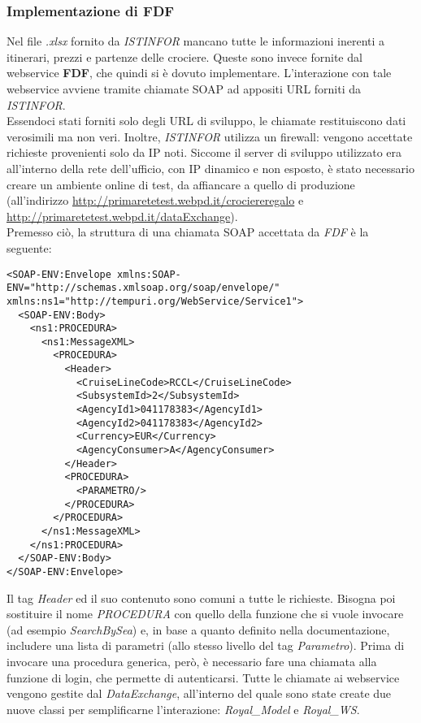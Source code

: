 \subsubsection{Implementazione di FDF}
Nel file \textit{.xlsx} fornito da \textit{ISTINFOR} mancano tutte le informazioni inerenti a itinerari, prezzi e partenze delle crociere. Queste sono invece fornite dal \gls{webservice} \textbf{FDF}, che quindi si è dovuto implementare. L'interazione con tale \gls{webservice} avviene tramite chiamate \gls{SOAP} ad appositi URL forniti da \textit{ISTINFOR}.\\ Essendoci stati forniti solo degli URL di sviluppo, le chiamate restituiscono dati verosimili ma non veri. Inoltre, \textit{ISTINFOR} utilizza un firewall: vengono accettate richieste provenienti solo da IP noti. Siccome il server di sviluppo utilizzato era all'interno della rete dell'ufficio, con IP dinamico e non esposto, è stato necessario creare un ambiente online di test, da affiancare a quello di produzione (all'indirizzo \url{http://primaretetest.webpd.it/crociereregalo} e \url{http://primaretetest.webpd.it/dataExchange}).\\
Premesso ciò, la struttura di una chiamata \gls{SOAP} accettata da \textit{FDF} è la seguente:
\begin{lstlisting}
<SOAP-ENV:Envelope xmlns:SOAP-ENV="http://schemas.xmlsoap.org/soap/envelope/" xmlns:ns1="http://tempuri.org/WebService/Service1">
  <SOAP-ENV:Body>
    <ns1:PROCEDURA>
      <ns1:MessageXML>
        <PROCEDURA>
          <Header>
            <CruiseLineCode>RCCL</CruiseLineCode>
            <SubsystemId>2</SubsystemId>
            <AgencyId1>041178383</AgencyId1>
            <AgencyId2>041178383</AgencyId2>
            <Currency>EUR</Currency>
            <AgencyConsumer>A</AgencyConsumer>
          </Header>
          <PROCEDURA>
            <PARAMETRO/>
          </PROCEDURA>
        </PROCEDURA>
      </ns1:MessageXML>
    </ns1:PROCEDURA>
  </SOAP-ENV:Body>
</SOAP-ENV:Envelope>
\end{lstlisting}Il tag \textit{Header} ed il suo contenuto sono comuni a tutte le richieste. Bisogna poi sostituire il nome \textit{PROCEDURA} con quello della funzione che si vuole invocare (ad esempio \textit{SearchBySea}) e, in base a quanto definito nella documentazione, includere una lista di parametri (allo stesso livello del tag \textit{Parametro}). Prima di invocare una procedura generica, però, è necessario fare una chiamata alla funzione di login, che permette di autenticarsi.
Tutte le chiamate ai \gls{webservice} vengono gestite dal \textit{DataExchange}, all'interno del quale sono state create due nuove classi per semplificarne l'interazione: \textit{Royal\_Model} e \textit{Royal\_WS}.\\
